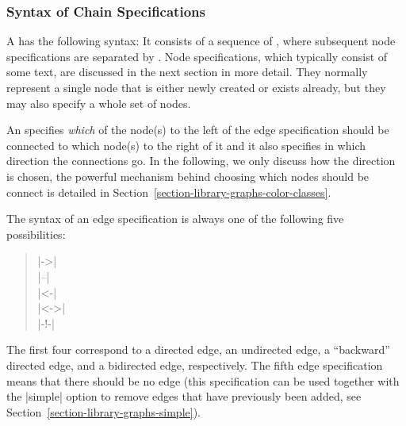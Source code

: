 \subsubsection{Syntax of Chain Specifications}

A  has the following syntax: It consists of
a sequence of , where subsequent node 
specifications are separated by . Node
specifications, which typically consist of some text, are discussed in
the next section in more detail. They normally represent a single node
that is either newly created or exists already, but they may also
specify a whole set of nodes.

An  specifies \emph{which} of the node(s) to
the left of the edge specification should be connected to which
node(s) to the right of it and it also specifies in which direction
the connections go. In the following, we only discuss how the
direction is chosen, the powerful mechanism behind choosing which
nodes should be connect is detailed in 
Section~\ref{section-library-graphs-color-classes}.

The syntax of an edge specification is always one of the following
five possibilities: 

\begin{quote}
  |->| \\
  |--| \\
  |<-| \\
  |<->| \\
  |-!-| 
\end{quote}

The first four correspond to a directed edge, an undirected edge, a
``backward'' directed edge, and a bidirected edge, respectively. The
fifth edge specification means that there should be no edge (this
specification can be used together with the |simple| option to remove
edges that have previously been added, see
Section~\ref{section-library-graphs-simple}). 

